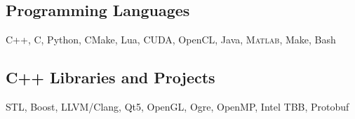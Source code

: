
\subsection{Programming Languages}

C++, C, Python, CMake, Lua, CUDA, OpenCL, Java, \textsc{Matlab}, Make, Bash

\subsection{C++ Libraries and Projects}
STL, Boost, LLVM/Clang, Qt5, OpenGL, Ogre, OpenMP, Intel TBB, Protobuf

